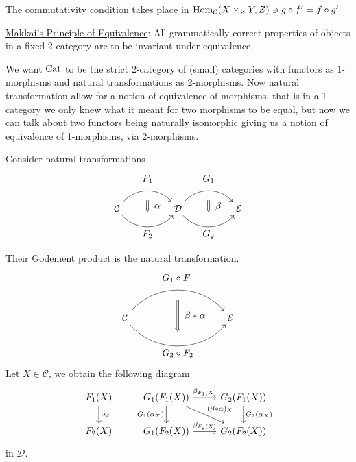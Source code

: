 The commutativity condition takes place in $ \operatorname{Hom}_{ \mathcal{ C } } ( X \times_Z Y , Z ) \ni g \circ f' = f \circ g' $

\underline{Makkai's Principle of Equivalence}:
All grammatically correct properties of objects in a fixed 2-category are to be invariant under equivalence.

\begin{rmk}
    We want $ \operatorname{Cat} $ to be the strict 2-category of (small) categories with functors as 1-morphisms and natural transformations as 2-morphisms.
    Now natural transformation allow for a notion of equivalence of morphisms, that is in a 1-category we only knew what it meant for two morphisms to be equal, but now we can talk about two functors being naturally isomorphic giving us a notion of equivalence of 1-morphisms, via 2-morphisms.
\end{rmk}

\begin{defi/prop}
    Consider natural transformations 
    \[
    \begin{tikzcd}[column sep=huge]	
    \mathcal{C}
    	\arrow[bend left=50]{r}[name=U,label=above:$F_1$]{}
    	\arrow[bend right=50]{r}[name=D,label=below:$F_2$]{}
    &
    \mathcal{D}
    \arrow[shorten <=10pt,shorten >=10pt,Rightarrow,to path={(U) -- node[label=right:$\alpha$] {} (D)}]{}
    	\arrow[bend left=50]{r}[name=U',label=above:$G_1$]{}
    	\arrow[bend right=50]{r}[name=D',label=below:$G_2$]{}
	&
	\mathcal{E} 
    \arrow[shorten <=10pt,shorten >=10pt,Rightarrow,to path={(U') -- node[label=right:$\beta$] {} (D')}]{}    	
    \end{tikzcd}
    \]
    
    Their Godement product is the natural transformation.
    \[
    \begin{tikzcd}[column sep=huge]	
    \mathcal{ C }
    	\arrow[bend left=50]{rr}[name=U,label=above:$G_1 \circ F_1$]{}
    	\arrow[bend right=50]{rr}[name=D,label=below:$G_2 \circ F_2$]{}
    &&
    \mathcal{E}
    \arrow[shorten <=10pt,shorten >=10pt,Rightarrow,to path={(U) -- node[label=right:$\beta * \alpha$] {} (D)}]{}
    \end{tikzcd}	
    \]
    Let $ X \in \mathcal{ C } $, we obtain the following diagram
    \[
    \begin{tikzcd}
        F_1 ( X ) 
        \ar[d, " \alpha_x "]
        &
        G_1 ( F_1 ( X ) ) 
        \ar[d, " G_1 ( \alpha_X ) "']
        \ar[rd, " {( \beta * \alpha )_X} "]
        \ar[r , " \beta_{ F_1 ( X ) } "]
        & 
        G_2 ( F_1 ( X ) )
        \ar[d, " G_2 ( \alpha_X ) "]
        \\
        F_2 ( X ) 
        &
        G_1 ( F_2 ( X ) ) 
        \ar[ r, " \beta_{ F_2 ( X ) }"]
        &
        G_2 ( F_2 ( X ) ) 
    \end{tikzcd}    
    \]
    in $ \mathcal{ D } $.
\end{defi/prop}

